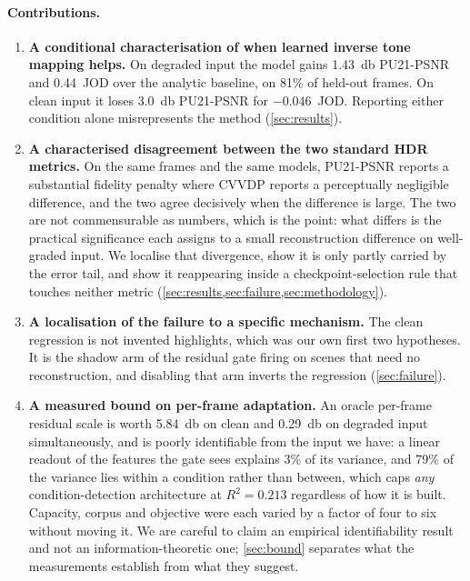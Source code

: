 \paragraph{Contributions.}
\begin{enumerate}
\item \textbf{A conditional characterisation of when learned inverse tone
  mapping helps.} On degraded input the model gains \SI{1.43}{\decibel}
  PU21-PSNR and \num{0.44}~JOD over the analytic baseline, on 81\% of held-out
  frames. On clean input it loses \SI{3.0}{\decibel} PU21-PSNR for
  $-0.046$~JOD. Reporting either condition alone misrepresents the method
  (\cref{sec:results}).

\item \textbf{A characterised disagreement between the two standard HDR
  metrics.} On the same frames and the same models, PU21-PSNR reports a
  substantial fidelity penalty where CVVDP reports a perceptually negligible
  difference, and the two agree decisively when the difference is large. The
  two are not commensurable as numbers, which is the point: what differs is the
  practical significance each assigns to a small reconstruction difference on
  well-graded input. We localise that divergence, show it is only partly carried
  by the error tail, and show it reappearing inside a checkpoint-selection rule
  that touches neither metric
  (\cref{sec:results,sec:failure,sec:methodology}).

\item \textbf{A localisation of the failure to a specific mechanism.} The clean
  regression is not invented highlights, which was our own first two hypotheses.
  It is the shadow arm of the residual gate firing on scenes that need no
  reconstruction, and disabling that arm inverts the regression
  (\cref{sec:failure}).

\item \textbf{A measured bound on per-frame adaptation.} An oracle per-frame
  residual scale is worth \SI{+5.84}{\decibel} on clean and
  \SI{+0.29}{\decibel} on degraded input simultaneously, and is poorly
  identifiable from the input we have: a linear readout of the features the gate
  sees explains \num{3}\% of its variance, and \num{79}\% of the variance lies
  within a condition rather than between, which caps \emph{any}
  condition-detection architecture at $R^2 = \num{0.213}$ regardless of how it
  is built. Capacity, corpus and objective were each varied by a factor of four
  to six without moving it. We are careful to claim an empirical identifiability
  result and not an information-theoretic one; \cref{sec:bound} separates what
  the measurements establish from what they suggest.


\end{enumerate}

